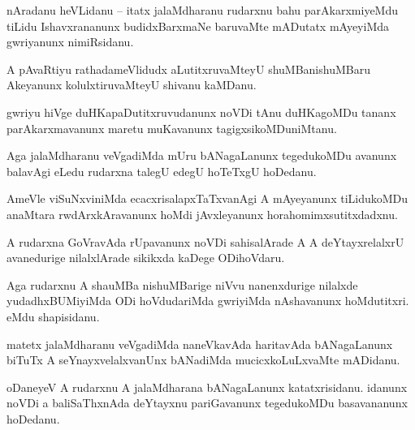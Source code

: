\documentclass{article}
\begin{document}

\begin{mn}%
nAradanu heVLidanu -- itatx jalaMdharanu rudarxnu bahu parAkarxmiyeMdu tiLidu Ishavxrananunx 
budidxBarxmaNe baruvaMte mADutatx mAyeyiMda gwriyanunx nimiRsidanu.
\end{mn}

\begin{mn}%
A pAvaRtiyu rathadameVlidudx aLutitxruvaMteyU shuMBanishuMBaru Akeyanunx kolulxtiruvaMteyU shivanu 
kaMDanu. 
\end{mn}

\begin{mn}%
gwriyu hiVge duHKapaDutitxruvudanunx noVDi tAnu duHKagoMDu tananx parAkarxmavanunx maretu 
muKavanunx tagigxsikoMDuniMtanu.
\end{mn}

\begin{mn}%
Aga jalaMdharanu veVgadiMda mUru bANagaLanunx tegedukoMDu avanunx balavAgi eLedu rudarxna talegU 
edegU hoTeTxgU hoDedanu.
\end{mn}

\begin{mn}%
AmeVle viSuNxviniMda ecacxrisalapxTaTxvanAgi A mAyeyanunx tiLidukoMDu anaMtara rwdArxkAravanunx 
hoMdi jAvxleyanunx horahomimxsutitxdadxnu.
\end{mn}

\begin{mn}%
A rudarxna GoVravAda rUpavanunx noVDi sahisalArade A A deYtayxrelalxrU avanedurige nilalxlArade 
sikikxda kaDege ODihoVdaru.
\end{mn}

\begin{mn}%
Aga rudarxnu A shauMBa nishuMBarige niVvu nanenxdurige nilalxde yudadhxBUMiyiMda ODi hoVdudariMda 
gwriyiMda nAshavanunx hoMdutitxri. eMdu shapisidanu.
\end{mn}

\begin{mn}%
matetx jalaMdharanu veVgadiMda naneVkavAda haritavAda bANagaLanunx biTuTx A seYnayxvelalxvanUnx 
bANadiMda mucicxkoLuLxvaMte mADidanu.
\end{mn}

\begin{mn}%
oDaneyeV A rudarxnu A jalaMdharana bANagaLanunx katatxrisidanu. idanunx noVDi a baliSaThxnAda 
deYtayxnu pariGavanunx tegedukoMDu basavananunx hoDedanu.
\end{mn}
\end{document}

